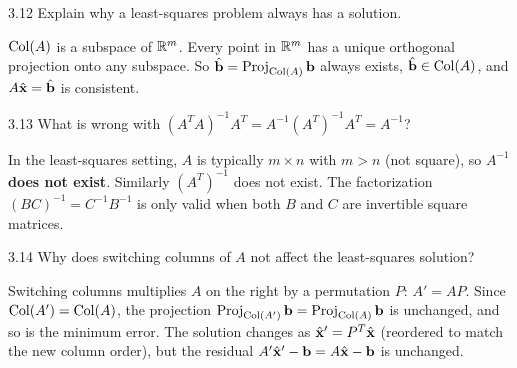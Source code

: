 \begin{exercise}{3.12}
Explain why a least-squares problem always has a solution.
\end{exercise}
\begin{solution}
$\operatorname{Col}(A)$ is a subspace of $\mathbb{R}^m$. Every point in $\mathbb{R}^m$ has a unique orthogonal projection onto any subspace. So $\hat{\mathbf{b}}=\operatorname{Proj}_{\operatorname{Col}(A)}\mathbf{b}$ always exists, $\hat{\mathbf{b}}\in\operatorname{Col}(A)$, and $A\hat{\mathbf{x}}=\hat{\mathbf{b}}$ is consistent.
\end{solution}

\begin{exercise}{3.13}
What is wrong with $(A^TA)^{-1}A^T = A^{-1}(A^T)^{-1}A^T = A^{-1}$?
\end{exercise}
\begin{solution}
In the least-squares setting, $A$ is typically $m\times n$ with $m>n$ (not square), so $A^{-1}$ \textbf{does not exist}. Similarly $(A^T)^{-1}$ does not exist. The factorization $(BC)^{-1}=C^{-1}B^{-1}$ is only valid when both $B$ and $C$ are invertible square matrices.
\end{solution}

\begin{exercise}{3.14}
Why does switching columns of $A$ not affect the least-squares solution?
\end{exercise}
\begin{solution}
Switching columns multiplies $A$ on the right by a permutation $P$: $A'=AP$. Since $\operatorname{Col}(A')=\operatorname{Col}(A)$, the projection $\operatorname{Proj}_{\operatorname{Col}(A')}\mathbf{b}=\operatorname{Proj}_{\operatorname{Col}(A)}\mathbf{b}$ is unchanged, and so is the minimum error. The solution changes as $\hat{\mathbf{x}}'=P^T\hat{\mathbf{x}}$ (reordered to match the new column order), but the residual $A'\hat{\mathbf{x}}'-\mathbf{b}=A\hat{\mathbf{x}}-\mathbf{b}$ is unchanged.
\end{solution}

